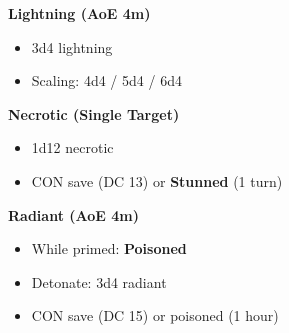 \begin{scifitablebox}[screenbox,title=\textcolor{PanelGlow}{Primers \& Detonators (Quick Reference)}]
\textbf{Lightning (AoE 4m)}
\begin{itemize}
\item 3d4 lightning
\item Scaling: 4d4 / 5d4 / 6d4
\end{itemize}

\textbf{Necrotic (Single Target)}
\begin{itemize}
\item 1d12 necrotic
\item CON save (DC 13) or \textbf{Stunned} (1 turn)
\end{itemize}

\textbf{Radiant (AoE 4m)}
\begin{itemize}
\item While primed: \textbf{Poisoned}
\item Detonate: 3d4 radiant
\item CON save (DC 15) or poisoned (1 hour)
\end{itemize}

\end{scifitablebox}



   